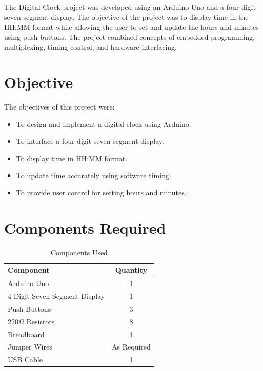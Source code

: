 \documentclass[12pt,a4paper]{report}
\begin{document}
The Digital Clock project was developed using an Arduino Uno and a four digit seven segment display. The objective of the project was to display time in the HH:MM format while allowing the user to set and update the hours and minutes using push buttons. The project combined concepts of embedded programming, multiplexing, timing control, and hardware interfacing.


\section{Objective}

The objectives of this project were:

\begin{itemize}
    \item To design and implement a digital clock using Arduino.
    \item To interface a four digit seven segment display.
    \item To display time in HH:MM format.
    \item To update time accurately using software timing.
    \item To provide user control for setting hours and minutes.
\end{itemize}


\section{Components Required}

\begin{table}[H]
\centering
\caption{Components Used}

\begin{tabular}{|l|c|}
\hline
Component & Quantity\\
\hline
Arduino Uno & 1\\
4-Digit Seven Segment Display & 1\\
Push Buttons & 3\\
220$\Omega$ Resistors & 8\\
Breadboard & 1\\
Jumper Wires & As Required\\
USB Cable & 1\\
\hline
\end{tabular}

\end{table}
\end{document}
